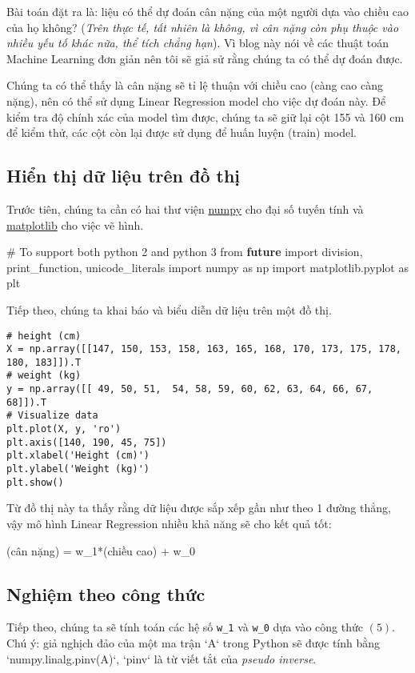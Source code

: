  
Bài toán đặt ra là: liệu có thể dự đoán cân nặng của một người dựa vào chiều cao của họ không? (\textit{Trên thực tế, tất nhiên là không, vì cân nặng còn phụ thuộc vào nhiều yếu tố khác nữa, thể tích chẳng hạn}). Vì blog này nói về các thuật toán Machine Learning đơn giản nên tôi sẽ giả sử rằng chúng ta có thể dự đoán được. 
 
Chúng ta có thể thấy là cân nặng sẽ tỉ lệ thuận với chiều cao (càng cao càng nặng), nên có thể sử dụng Linear Regression model cho việc dự đoán này. Để kiểm tra độ chính xác của model tìm được, chúng ta sẽ giữ lại cột 155 và 160 cm để kiểm thử, các cột còn lại được sử dụng để huấn luyện (train) model. 
 
 
\subsection{Hiển thị dữ liệu trên đồ thị}
Trước tiên, chúng ta cần có hai thư viện \href{http://www.numpy.org/}{numpy} cho đại số tuyến tính và \href{http://matplotlib.org/}{matplotlib} cho việc vẽ hình.  
 
 
\begin{python}
# To support both python 2 and python 3 
from \textbf{future} import division, print_function, unicode_literals 
import numpy as np  
import matplotlib.pyplot as plt 
\end{python}
 
Tiếp theo, chúng ta khai báo và biểu diễn dữ liệu trên một đồ thị. 
 
 
\begin{lstlisting}
# height (cm) 
X = np.array([[147, 150, 153, 158, 163, 165, 168, 170, 173, 175, 178, 180, 183]]).T 
# weight (kg) 
y = np.array([[ 49, 50, 51,  54, 58, 59, 60, 62, 63, 64, 66, 67, 68]]).T 
# Visualize data  
plt.plot(X, y, 'ro') 
plt.axis([140, 190, 45, 75]) 
plt.xlabel('Height (cm)') 
plt.ylabel('Weight (kg)') 
plt.show() 
\end{lstlisting}
 
 
 
 
Từ đồ thị này ta thấy rằng dữ liệu được sắp xếp gần như theo 1 đường thẳng, vậy mô hình Linear Regression nhiều khả năng sẽ cho kết quả tốt: 
 
(cân nặng) = w\_1*(chiều cao) + w\_0 
 
 
\subsection{Nghiệm theo công thức}
 
Tiếp theo, chúng ta sẽ tính toán các hệ số \texttt{w\_1} và \texttt{w\_0} dựa vào công thức $(5)$. Chú ý: giả nghịch đảo của một ma trận `A` trong Python sẽ được tính bằng `numpy.linalg.pinv(A)`, `pinv` là từ viết tắt của \textit{pseudo inverse}. 
 
